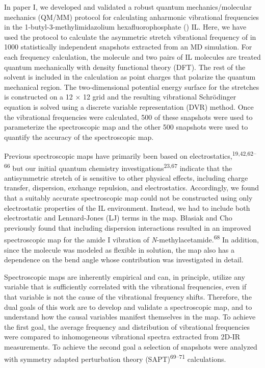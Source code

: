 \documentclass[]{article}
\begin{document}
In paper I, we developed and validated a robust quantum mechanics/molecular mechanics (QM/MM) protocol for calculating anharmonic  vibrational frequencies in the 1-butyl-3-methylimidazolium hexafluorophosphate (\ce{[C4C1im][PF6]}) IL. Here, we have used the protocol to calculate the asymmetric stretch vibrational frequency of  in 1000 statistically independent snapshots extracted from an MD simulation. For each frequency calculation, the  molecule and two pairs of IL molecules are treated quantum mechanically with density functional theory (DFT). The rest of the solvent is included in the calculation as point charges that polarize the quantum mechanical region. The two-dimensional potential energy surface for the  stretches is constructed on a 12 × 12 grid and the resulting vibrational Schrödinger equation is solved using a discrete variable representation (DVR) method. Once the vibrational frequencies were calculated, 500 of these snapshots were used to parameterize the spectroscopic map and the other 500 snapshots were used to quantify the accuracy of the spectroscopic map.

Previous spectroscopic maps have primarily been based on electrostatics,\textsuperscript{19,42,62--66} but our initial quantum chemistry investigations\textsuperscript{23,67} indicate that the antisymmetric stretch of  is sensitive to other physical effects, including charge transfer, dispersion, exchange repulsion, and electrostatics. Accordingly, we found that a suitably accurate spectroscopic map could not be constructed using only electrostatic properties of the IL environment. Instead, we had to include both electrostatic and Lennard-Jones (LJ) terms in the map.  Błasiak and Cho previously found that including dispersion interactions resulted in an improved spectroscopic map for the amide I vibration of \textit{N}-methylacetamide.\textsuperscript{68} In addition, since the  molecule was modeled as flexible in solution, the map also has a dependence on the  bend angle whose contribution was investigated in detail.

Spectroscopic maps are inherently empirical and can, in principle, utilize any variable that is sufficiently correlated with the vibrational frequencies, even if that variable is not the cause of the vibrational frequency shifts. Therefore, the dual goals of this work are to develop and validate a spectroscopic map, and to understand how the causal variables manifest themselves in the map. To achieve the first goal, the average frequency and distribution of vibrational frequencies were compared to inhomogeneous vibrational spectra extracted from 2D-IR measurements. To achieve the second goal a selection of snapshots were analyzed with symmetry adapted perturbation theory (SAPT)\textsuperscript{69--71} calculations.
\end{document}
